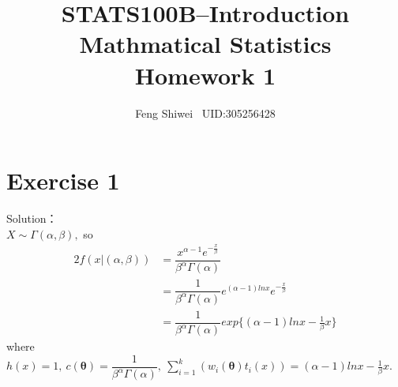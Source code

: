 \documentclass[a4papers]{ctexart}
\title{STATS100B--Introduction Mathmatical Statistics \\Homework 1}
\author{Feng Shiwei \ UID:305256428}
\date{}
\begin{document}
\maketitle
\section*{Exercise 1}
\noindent Solution：\\
\indent 
$X\sim \Gamma(\alpha,\beta),$ so
\begin{alignat*}{2}
    f(x|(\alpha,\beta))&=\dfrac{x^{\alpha-1}e^{-\frac{x}{\beta}}}{\beta^\alpha\Gamma(\alpha)}\\
    &= \dfrac{1}{\beta^\alpha\Gamma(\alpha)}e^{(\alpha-1)lnx}e^{-\frac{x}{\beta}}\\
    &= \dfrac{1}{\beta^\alpha\Gamma(\alpha)}exp\{(\alpha-1)lnx-\frac{1}{\beta}x\}
\end{alignat*}
where $h(x)=1,\ c(\boldsymbol{\theta})=\dfrac{1}{\beta^\alpha\Gamma(\alpha)},\ 
\sum_{i=1}^{k}\left(w_i(\boldsymbol{\theta})t_i(x) \right)=(\alpha-1)lnx-\frac{1}{\beta}x.$
\end{document}
